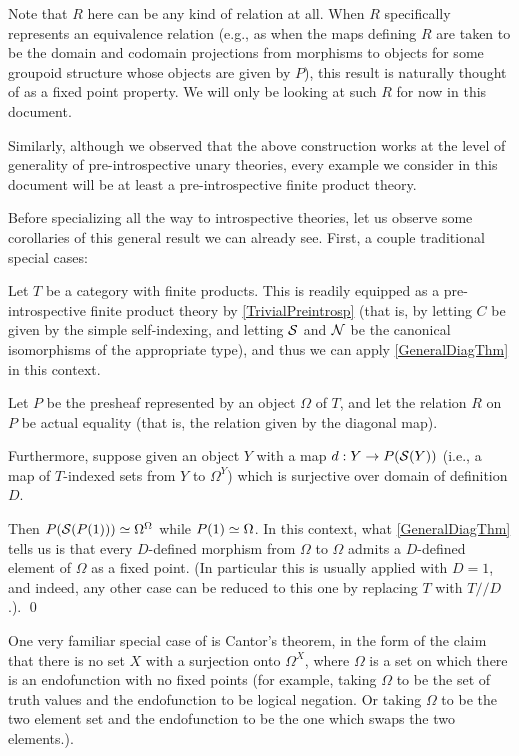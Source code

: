 Note that $R$ here can be any kind of relation at all. When $R$ specifically represents an equivalence relation (e.g., as when the maps defining $R$ are taken to be the domain and codomain projections from morphisms to objects for some groupoid structure whose objects are given by $P$), this result is naturally thought of as a fixed point property. We will only be looking at such $R$ for now in this document.

Similarly, although we observed that the above construction works at the level of generality of pre-introspective unary theories, every example we consider in this document will be at least a pre-introspective finite product theory.

Before specializing all the way to introspective theories, let us observe some corollaries of this general result we can already see. First, a couple traditional special cases:

\label{LawveresTheorem}
Let $T$ be a category with finite products. This is readily equipped as a pre-introspective finite product theory by \cref{TrivialPreintrosp} (that is, by letting $C$ be given by the simple self-indexing, and letting $\mathcal{S}$ and $\mathcal{N}$ be the canonical isomorphisms of the appropriate type), and thus we can apply \cref{GeneralDiagThm} in this context.

Let $P$ be the presheaf represented by an object $\Omega$ of $T$, and let the relation $R$ on $P$ be actual equality (that is, the relation given by the diagonal map). 

Furthermore, suppose given an object $Y$ with a map $d : Y \to P(\mathcal{S}(Y))$ (i.e., a map of $T$-indexed sets from $Y$ to $\Omega^Y$) which is surjective over domain of definition $D$.

Then $P(\mathcal{S}(P(1))) \simeq \Omega^{\Omega}$ while $P(1) \simeq \Omega$. In this context, what \cref{GeneralDiagThm} tells us is that every $D$-defined morphism from $\Omega$ to $\Omega$ admits a $D$-defined element of $\Omega$ as a fixed point. (In particular this is usually applied with $D = 1$, and indeed, any other case can be reduced to this one by replacing $T$ with $T//D$.). \qed
{}

\label{CantorsTheorem}
One very familiar special case of  is Cantor's theorem, in the form of the claim that there is no set $X$ with a surjection onto $\Omega^X$, where $\Omega$ is a set on which there is an endofunction with no fixed points (for example, taking $\Omega$ to be the set of truth values and the endofunction to be logical negation. Or taking $\Omega$ to be the two element set and the endofunction to be the one which swaps the two elements.).

